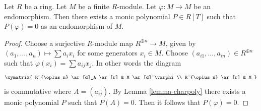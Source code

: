 \begin{lemma}
\label{lemma-charpoly-module}
Let $R$ be a ring.
Let $M$ be a finite $R$-module.
Let $\varphi : M \to M$ be an endomorphism.
Then there exists a monic polynomial $P \in R[T]$ such that
$P(\varphi) = 0$ as an endomorphism of $M$.
\end{lemma}

\begin{proof}
Choose a surjective $R$-module map $R^{\oplus n} \to M$, given by
$(a_1, \ldots, a_n) \mapsto \sum a_ix_i$ for some generators $x_i \in M$.
Choose $(a_{i1}, \ldots, a_{in}) \in R^{\oplus n}$ such that
$\varphi(x_i) = \sum a_{ij} x_j$. In other words the diagram
$$
\xymatrix{
R^{\oplus n} \ar[d]_A \ar[r] & M \ar[d]^\varphi \\
R^{\oplus n} \ar[r] & M
}
$$
is commutative where $A = (a_{ij})$. By
Lemma \ref{lemma-charpoly}
there exists a monic polynomial $P$ such that $P(A) = 0$.
Then it follows that $P(\varphi) = 0$.
\end{proof}
